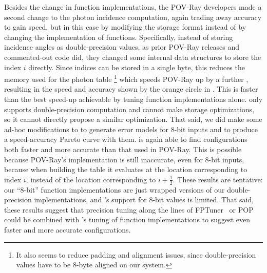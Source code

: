 \documentclass[paper.tex]{subfiles}
\begin{document}
Besides the change in function implementations,
  the POV-Ray developers made a second change
  to the photon incidence computation,
  again trading away accuracy to gain speed,
  but in this case by modifying the storage format
  instead of by changing the implementation of functions.
Specifically, instead of storing incidence angles as double-precision values,
  as prior POV-Ray releases and commented-out code did,
  they changed some internal data structures
  to store the index $i$ directly.
Since indices can be stored in a single byte,
  this reduces the memory used for the photon table%
\footnote{It also seems to reduce padding and alignment issues,
  since double-precision values have to be 8-byte aligned on our system.}
  which speeds POV-Ray up by a further \nPovRayCharSpeedup,
  resulting in the speed and accuracy shown by the orange circle
  in .
This is faster than the best speed-up achievable
  by tuning function implementations alone.
\name only supports double-precision computation
  and cannot make storage optimizations,
  so it cannot directly propose a similar optimization.
That said, we did make some ad-hoc modifications to \name
  to generate error models for 8-bit inputs
  and to produce a speed-accuracy Pareto curve with them.
\name is again able to find configurations
  both faster and more accurate than that used in POV-Ray.
This is possible because POV-Ray's implementation
  is still inaccurate, even for 8-bit inputs,
  because when building the table it evaluates 
  at the location corresponding to index $i$,
  instead of the location corresponding to $i + \frac12$.
These results are tentative:
  our ``8-bit'' function implementations are just
  wrapped versions of our double-precision implementations,
  and \name's support for 8-bit values is limited.
That said, these results suggest that
  precision tuning along the lines of FPTuner~\cite{fptuner} or POP~\cite{pop}
  could be combined with \name's tuning of function implementations
  to suggest even faster and more accurate configurations.
\end{document}
